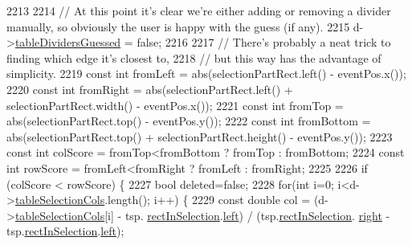 \begin{DoxyCode}
2213 
2214                         \textcolor{comment}{// At this point it's clear we're either adding or removing a divider manually, so
       obviously the user is happy with the guess (if any).}
2215                         d->\hyperlink{classPageViewPrivate_a2ceb798d9b9f218e6acc3769d01102f4}{tableDividersGuessed} = \textcolor{keyword}{false};
2216 
2217                         \textcolor{comment}{// There's probably a neat trick to finding which edge it's closest to,}
2218                         \textcolor{comment}{// but this way has the advantage of simplicity.}
2219                         \textcolor{keyword}{const} \textcolor{keywordtype}{int} fromLeft = abs(selectionPartRect.left() - eventPos.x());
2220                         \textcolor{keyword}{const} \textcolor{keywordtype}{int} fromRight = abs(selectionPartRect.left() + selectionPartRect.width() - 
      eventPos.x());
2221                         \textcolor{keyword}{const} \textcolor{keywordtype}{int} fromTop = abs(selectionPartRect.top() - eventPos.y());
2222                         \textcolor{keyword}{const} \textcolor{keywordtype}{int} fromBottom = abs(selectionPartRect.top() + selectionPartRect.height() - 
      eventPos.y());
2223                         \textcolor{keyword}{const} \textcolor{keywordtype}{int} colScore = fromTop<fromBottom ? fromTop : fromBottom;
2224                         \textcolor{keyword}{const} \textcolor{keywordtype}{int} rowScore = fromLeft<fromRight ? fromLeft : fromRight;
2225 
2226                         \textcolor{keywordflow}{if} (colScore < rowScore) \{
2227                             \textcolor{keywordtype}{bool} deleted=\textcolor{keyword}{false};
2228                             \textcolor{keywordflow}{for}(\textcolor{keywordtype}{int} i=0; i<d->\hyperlink{classPageViewPrivate_a9d6389f129073d1af9973814a2b1d418}{tableSelectionCols}.length(); i++) \{
2229                                 \textcolor{keyword}{const} \textcolor{keywordtype}{double} col = (d->\hyperlink{classPageViewPrivate_a9d6389f129073d1af9973814a2b1d418}{tableSelectionCols}[i] - tsp.
      \hyperlink{structTableSelectionPart_a237572cb28552e59818071208c21ee43}{rectInSelection}.\hyperlink{classOkular_1_1NormalizedRect_a76336fe9d733f2b559cf8df3ef48f9e7}{left}) / (tsp.\hyperlink{structTableSelectionPart_a237572cb28552e59818071208c21ee43}{rectInSelection}.
      \hyperlink{classOkular_1_1NormalizedRect_a12bbdbb865e6282c9a325b61638553f4}{right} - tsp.\hyperlink{structTableSelectionPart_a237572cb28552e59818071208c21ee43}{rectInSelection}.\hyperlink{classOkular_1_1NormalizedRect_a76336fe9d733f2b559cf8df3ef48f9e7}{left});

\end{DoxyCode}
